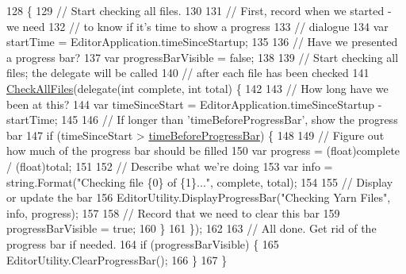 \begin{DoxyCode}
128                                  \{
129             \textcolor{comment}{// Start checking all files.}
130 
131             \textcolor{comment}{// First, record when we started - we need}
132             \textcolor{comment}{// to know if it's time to show a progress}
133             \textcolor{comment}{// dialogue}
134             var startTime = EditorApplication.timeSinceStartup;
135 
136             \textcolor{comment}{// Have we presented a progress bar?}
137             var progressBarVisible = \textcolor{keyword}{false};
138 
139             \textcolor{comment}{// Start checking all files; the delegate will be called}
140             \textcolor{comment}{// after each file has been checked}
141             \hyperlink{a00188_a8e59ec20bd21bb1f8a6d4f02980f624b}{CheckAllFiles}(delegate(\textcolor{keywordtype}{int} complete, \textcolor{keywordtype}{int} total) \{
142 
143                 \textcolor{comment}{// How long have we been at this?}
144                 var timeSinceStart = EditorApplication.timeSinceStartup - startTime;
145 
146                 \textcolor{comment}{// If longer than 'timeBeforeProgressBar', show the progress bar}
147                 \textcolor{keywordflow}{if} (timeSinceStart > \hyperlink{a00188_a62a14b3fbaf2da41154ebad0eb7b6d3f}{timeBeforeProgressBar}) \{
148 
149                     \textcolor{comment}{// Figure out how much of the progress bar should be filled}
150                     var progress = (float)complete / (\textcolor{keywordtype}{float})total;
151 
152                     \textcolor{comment}{// Describe what we're doing}
153                     var info = string.Format(\textcolor{stringliteral}{"Checking file \{0\} of \{1\}..."}, complete, total);
154 
155                     \textcolor{comment}{// Display or update the bar}
156                     EditorUtility.DisplayProgressBar(\textcolor{stringliteral}{"Checking Yarn Files"}, info, progress);
157 
158                     \textcolor{comment}{// Record that we need to clear this bar}
159                     progressBarVisible = \textcolor{keyword}{true};
160                 \}
161             \});
162 
163             \textcolor{comment}{// All done. Get rid of the progress bar if needed.}
164             \textcolor{keywordflow}{if} (progressBarVisible) \{
165                 EditorUtility.ClearProgressBar();
166             \}
167         \}
\end{DoxyCode}
